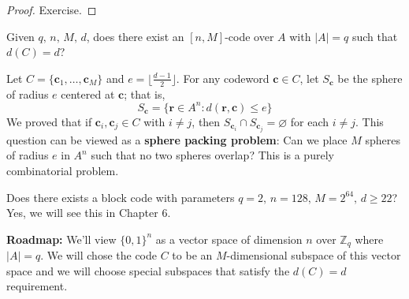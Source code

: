 \begin{proof}
    Exercise.
\end{proof}

Given $ q,\,n,\,M,\,d $, does there exist an $ [n,M] $-code over $ A $
with $ |A|=q $ such that $ d(C)=d $?

Let $ C=\{\bm{c}_1,\ldots ,\bm{c}_M\} $ and $ e=\lfloor \frac{d-1}{2} \rfloor $.
For any codeword $ \bm{c}\in C $, let $ S_{\bm{c}} $ be the sphere of radius $ e $ centered at
$ \bm{c} $;
that is,
\[ S_{\bm{c}}= \{\bm{r}\in A^n:d(\bm{r},\bm{c})\leqslant e\} \]
We proved that if $ \bm{c}_i,\bm{c}_j\in C $ with $ i\neq j $,
then $ S_{\bm{c}_i}\cap S_{\bm{c}_j}= \varnothing $ for each $ i\neq j $.
This question can be viewed as a \textbf{sphere packing problem}:
Can we place $ M $ spheres of radius $ e $ in $ A^n $ such that
no two spheres overlap? This is a purely combinatorial problem.

Does there exists a block code with parameters
$ q=2,\,n=128,\,M=2^{64},\,d\geqslant 22 $? Yes, we will see this in Chapter 6.

\textbf{Roadmap:} We'll view $ \{0,1\}^{n} $ as a vector space of
dimension $ n $ over $ \mathbb{Z}_q $ where $ |A|=q $. We will chose the code
$ C $ to be an $ M $-dimensional subspace of this vector space
and we will choose special subspaces that satisfy the $ d(C)=d $ requirement.
